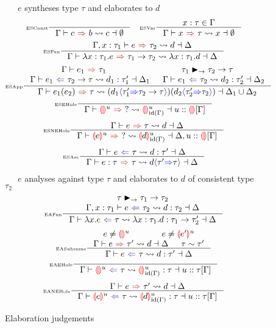 \begin{figure}[H]
\small
{}\ \ \ $e$ syntheses type $\tau$ and elaborates to $d$
\tiny 
\[\inference[\tiny ESConst]{}{\elaborationSynthesis{c}{b}{c}{\emptyset}} \quad 
\inference[\tiny ESVar]{x : \tau \in \Gamma}{\elaborationSynthesis{x}{\tau}{x}{\emptyset}}\]
\[\inference[\tiny ESFun]{\elaborationSynthesis[\Gamma,x:\tau_1]{e}{\tau_2}{d}{\Delta}}{\elaborationSynthesis{\lambda x:\tau_1.e}{\tau_1 \to \tau_2}{\lambda x:\tau_1. d}{\Delta}}\]
\[\inference[\tiny ESApp]{\synthesis{e_1}{\tau_1} & \tau_1 \funmatch \tau_2 \to \tau \\ \elaborationAnalysis{e_1}{\tau_2 \to \tau}{d_1}{\tau_1'}{\Delta_1} & \elaborationAnalysis{e_1}{\tau_2}{d_2}{\tau_2'}{\Delta_2}}{\elaborationSynthesis{e_1(e_2)}{\tau}{(d_1\scast{\tau_1'}{\tau_2 \to \tau})(d_2\scast{\tau_2'}{\tau_2})}{\Delta_1 \cup \Delta_2}}\]
\[\inference[\tiny ESEHole]{}{\elaborationSynthesis{\hole^u}{?}{\hole^u_{\mathrm{id}(\Gamma)}}{u :: \hole[] [\Gamma]}}\]
\[\inference[\tiny ESNEHole]{\elaborationSynthesis{e}{\tau}{d}{\Delta}}{\elaborationSynthesis{\hole[e]^u}{?}{\hole[d]^u_{\mathrm{id}(\Gamma)}}{\Delta, u :: \hole[] [\Gamma]}}\]
\[\inference[\tiny ESAsc]{\elaborationAnalysis{e}{\tau}{d}{\tau'}{\Delta}}{\elaborationSynthesis{e:\tau}{\tau}{d\scast{\tau'}{\tau}}{\Delta}}\]
\small
{}\ \ \ $e$ analyses against type $\tau$ and elaborates to $d$ of consistent type $\tau_2$
\tiny 
\[\inference[\tiny EAFun]{\tau \funmatch \tau_1 \to \tau_2 \\ \elaborationAnalysis[\Gamma,x:\tau_1]{e}{\tau_2}{d}{\tau_2}{\Delta}}{\elaborationAnalysis{\lambda x. e}{\tau}{\lambda x:\tau_1. d}{\tau_1 \to \tau_2'}{\Delta}}\]
\[\inference[\tiny EASubsume]{e \neq \hole^u & e \neq \hole[e']^u \\ \elaborationSynthesis{e}{\tau'}{d}{\Delta} & \tau \sim \tau'}{\elaborationAnalysis{e}{\tau}{d}{\tau'}{\Delta}}\]
\[\inference[\tiny EAEHole]{}{\elaborationAnalysis{\hole^u}{\tau}{\hole^u_{\mathrm{id}(\Gamma)}}{\tau}{u::\tau[\Gamma]}}\]
\[\inference[\tiny EANEHole]{\elaborationSynthesis{e}{\tau'}{d}{\Delta}}{\elaborationAnalysis{\hole[e]^u}{\tau}{\hole[d]^u_{\mathrm{id}(\Gamma)}}{\tau}{u::\tau[\Gamma]}}\]

\caption{Elaboration judgements} 
\label{fig:elaboration}
\end{figure}

